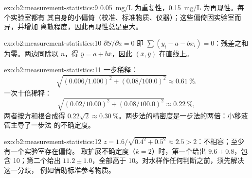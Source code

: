 \begin{solution}{exo:b2:measurement-statistics:9}
\qty{0.05}{mg/L} 为重复性，\qty{0.15}{mg/L} 为再现性。每个实验室都有
其自身的小偏倚（校准、标准物质、仪器）；这些偏倚因实验室而异，并增加
离散程度，因此再现性总是更大。
\end{solution}

\begin{solution}{exo:b2:measurement-statistics:10}
$\partial S/\partial a = 0$ 即 $\sum(y_i - a - bx_i) = 0$：残差之和为零。两边同除以
$n$，得 $\bar y = a + b\bar x$，因此 $(\bar x, \bar y)$ 在直线上。
\end{solution}

\begin{solution}{exo:b2:measurement-statistics:11}
一步稀释：
\[\sqrt{(0.006/1.000)^2 + (0.08/100.0)^2} \approx 0.61~\%.\]
一次十倍稀释：
\[\sqrt{(0.02/10.00)^2 + (0.08/100.0)^2} \approx 0.22~\%,\]
两者按方和根合成得 $0.22\sqrt2 \approx 0.30~\%$。两步法的精密度是一步法的两倍：小移液管主导了一步法
的不确定度。
\end{solution}

\begin{solution}{exo:b2:measurement-statistics:12}
$z = 1.6/\sqrt{0.4^2 + 0.5^2} \approx 2.5 > 2$：不相容；至少有一个实验室存在偏倚。
取扩展不确定度（$k = 2$）时，第一个给出 $9.6 \pm 0.8$，包含 10；第二个给出
$11.2 \pm 1.0$，全部高于 10。对水样作任何判断之前，须先解决这一分歧，
例如借助标准参考物质。
\end{solution}


